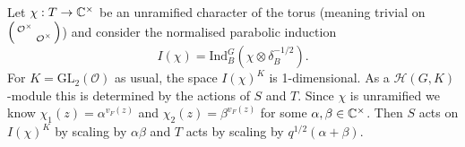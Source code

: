 \begin{prop}
    Let $\chi:T \to \mathbb{C}^\times$ be an unramified character of the torus (meaning trivial on $\begin{psmallmatrix}\mathcal O^\times & \\ & \mathcal O^\times \end{psmallmatrix}$) and consider the normalised parabolic induction $$I(\chi) = \mathrm{Ind}_B^G(\chi \otimes \delta_B^{-1/2}).$$ For $K=\mathrm{GL}_2(\mathcal O)$ as usual, the space $I(\chi)^K$ is 1-dimensional. As a $\mathcal H(G,K)$-module this is determined by the actions of $S$ and $T$. Since $\chi$ is unramified we know $\chi_1(z)=\alpha^{v_F(z)}$ and $\chi_2(z)=\beta^{v_F(z)}$ for some $\alpha,\beta \in \mathbb{C}^\times$. Then $S$ acts on $I(\chi)^K$ by scaling by $\alpha\beta$ and $T$ acts by scaling by $q^{1/2}(\alpha +\beta)$.  
\end{prop}
